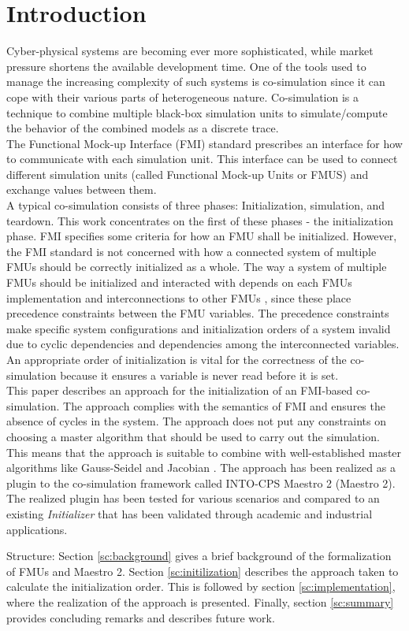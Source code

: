 \section{Introduction}\label{sc:introduction}
Cyber-physical systems are becoming ever more sophisticated, while market pressure shortens the available development time. One of the tools used to manage the increasing complexity of such systems is co-simulation since it can cope with their various parts of heterogeneous nature. Co-simulation is a technique to combine multiple black-box simulation units to simulate/compute the behavior of the combined models as a discrete trace\cite{Kubler2000}. \\
The Functional Mock-up Interface (FMI) standard \cite{Blochwitz2012, fmi_2019} prescribes an interface for how to communicate with each simulation unit. This interface can be used to connect different simulation units (called Functional Mock-up Units or FMUS) and exchange values between them. \\
A typical co-simulation consists of three phases: Initialization, simulation, and teardown. This work concentrates on the first of these phases - the initialization phase. FMI specifies some criteria for how an FMU shall be initialized. However, the FMI standard is not concerned with how a connected system of multiple FMUs should be correctly initialized as a whole. 
The way a system of multiple FMUs should be initialized and interacted with depends on each FMUs implementation and interconnections to other FMUs \cite{gomes_lucio_vangheluwe_2019}, since these place precedence constraints between the FMU variables. The precedence constraints make specific system configurations and initialization orders of a system invalid due to cyclic dependencies and dependencies among the interconnected variables. An appropriate order of initialization is vital for the correctness of the co-simulation \cite{Thule2018} because it ensures a variable is never read before it is set.\\
This paper describes an approach for the initialization of an FMI-based co-simulation. The approach complies with the semantics of FMI and ensures the absence of cycles in the system. The approach does not put any constraints on choosing a master algorithm that should be used to carry out the simulation. This means that the approach is suitable to combine with well-established master algorithms like Gauss-Seidel and Jacobian \cite{Palensky2017}. The approach has been realized as a plugin to the co-simulation framework called INTO-CPS Maestro 2 (Maestro 2). The realized plugin has been tested for various scenarios and compared to an existing \textit{Initializer} that has been validated through academic and industrial applications.

\noindent Structure: Section \ref{sc:background} gives a brief background of the formalization of FMUs and Maestro 2. Section \ref{sc:initilization} describes the approach taken to calculate the initialization order. This is followed by section \ref{sc:implementation}, where the realization of the approach is presented. Finally, section \ref{sc:summary} provides concluding remarks and describes future work.